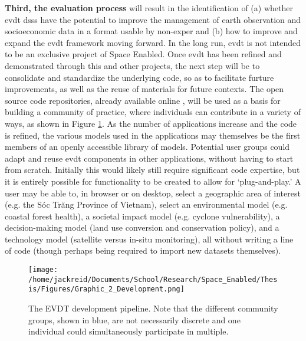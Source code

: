 \documentclass[notitlepage]{article}
\begin{document}
\textbf{Third, the evaluation process} will result in the identification of (a) whether \ac{evdt} \acp{dss} have the potential to improve the management of earth observation and socioeconomic data in a format usable by non-exper and (b) how to improve and expand the \ac{evdt} framework moving forward. In the long run, \ac{evdt} is not intended to be an exclusive project of Space Enabled. Once \ac{evdt} has been refined and demonstrated through this and other projects, the next step will be to consolidate and standardize the underlying code, so as to facilitate furture improvements, as well as the reuse of materials for future contexts. The open source code repositories, already available online \cite{bluerasterBlueRasterVida2021,reidEVDTRepository2020,reidMITVidaRepository2021}, will be used as a basis for building a community of practice, where individuals can contribute in a variety of ways, as shown in Figure \ref{fig:development}. As the number of applications increase and the code is refined, the various models used in the applications may themselves be the first members of an openly accessible library of models. Potential user groups could adapt and reuse \ac{evdt} components in other applications, without having to start from scratch. Initially this would likely still require significant code expertise, but it is entirely possible for functionality to be created to allow for `plug-and-play.' A user may be able to, in browser or on desktop, select a geographic area of interest (e.g. the Sóc Trăng Province of Vietnam), select an environmental model (e.g. coastal forest health), a societal impact model (e.g. cyclone vulnerability), a decision-making model (land use conversion and conservation policy), and a technology model (satellite versus in-situ monitoring), all without writing a line of code (though perhaps being required to import new datasets themselves).

\begin{figure}[h]
	\centering
	\texttt{[image: /home/jackreid/Documents/School/Research/Space\_Enabled/Thesis/Figures/Graphic\_2\_Development.png]}
	\caption{The EVDT development pipeline. Note that the different community groups, shown in blue, are not necessarily discrete and one individual could simultaneously participate in multiple.}
	\label{fig:development}
\end{figure}
\end{document}
